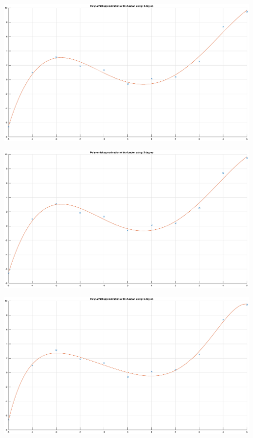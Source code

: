 \documentclass[12pt]{report}
\begin{document}
\begin{center}
   \includegraphics[scale=0.25]{14.eps}
\end{center}

\begin{center}
   \includegraphics[scale=0.25]{15.eps}
\end{center}

\begin{center}
   \includegraphics[scale=0.25]{16.eps}
\end{center}
\end{document}

